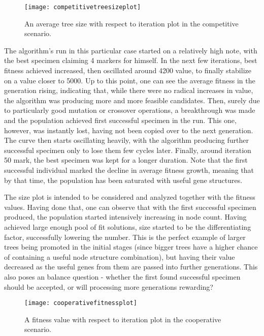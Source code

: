 \begin{figure}[h]
    \centering
    \texttt{[image: competitivetreesizeplot]}
    \caption{An average tree size with respect to iteration plot in the competitive scenario.}
    \label{fig:x competitivetreesizeplot}
\end{figure}
The algorithm's run in this particular case started on a relatively high note, with the best specimen claiming 4 markers for himself. In the next few iterations, best fitness achieved increased, then oscillated around 4200 value, to finally stabilize on a value closer to 5000. Up to this point, one can see the average fitness in the generation rising, indicating that, while there were no radical increases in value, the algorithm was producing more and more feasible candidates. Then, surely due to particularly good mutation or crossover operations, a breakthrough was made and the population achieved first successful specimen in the run. This one, however, was instantly lost, having not been copied over to the next generation. The curve then starts oscillating heavily, with the algorithm producing further successful specimen only to lose them few cycles later. Finally, around iteration 50 mark, the best specimen was kept for a longer duration. Note that the first successful individual marked the decline in average fitness growth, meaning that by that time, the population has been saturated with useful gene structures.

The size plot is intended to be considered and analyzed together with the fitness values. Having done that, one can observe that with the first successful specimen produced, the population started intensively increasing in node count. Having achieved large enough pool of fit solutions, size started to be the differentiating factor, successfully lowering the number. This is the perfect example of larger trees being promoted in the initial stages (since bigger trees have a higher chance of containing a useful node structure combination), but having their value decreased as the useful genes from them are passed into further generations. This also poses an balance question - whether the first found successful specimen should be accepted, or will processing more generations rewarding?

\begin{figure}[h]
    \centering
    \texttt{[image: cooperativefitnessplot]}
    \caption{A fitness value with respect to iteration plot in the cooperative scenario.}
    \label{fig:x cooperativefitnessplot}
\end{figure}


